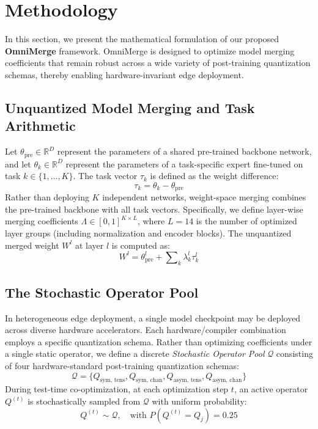 \section{Methodology}
\label{sec:method}

In this section, we present the mathematical formulation of our proposed \textbf{OmniMerge} framework. OmniMerge is designed to optimize model merging coefficients that remain robust across a wide variety of post-training quantization schemas, thereby enabling hardware-invariant edge deployment.

\subsection{Unquantized Model Merging and Task Arithmetic}
Let $\theta_{\text{pre}} \in \mathbb{R}^D$ represent the parameters of a shared pre-trained backbone network, and let $\theta_k \in \mathbb{R}^D$ represent the parameters of a task-specific expert fine-tuned on task $k \in \{1, \dots, K\}$. The task vector $\tau_k$ is defined as the weight difference:
\begin{equation}
    \tau_k = \theta_k - \theta_{\text{pre}}
\end{equation}
Rather than deploying $K$ independent networks, weight-space merging combines the pre-trained backbone with all task vectors. Specifically, we define layer-wise merging coefficients $\Lambda \in [0, 1]^{K \times L}$, where $L = 14$ is the number of optimized layer groups (including normalization and encoder blocks). The unquantized merged weight $W^l$ at layer $l$ is computed as:
\begin{equation}
    W^l = \theta^l_{\text{pre}} + \sum\nolimits_k \lambda^l_k \tau^l_k
\end{equation}

\subsection{The Stochastic Operator Pool}
In heterogeneous edge deployment, a single model checkpoint may be deployed across diverse hardware accelerators. Each hardware/compiler combination employs a specific quantization schema. Rather than optimizing coefficients under a single static operator, we define a discrete \emph{Stochastic Operator Pool} $\mathcal{Q}$ consisting of four hardware-standard post-training quantization schemas:
\begin{equation}
    \mathcal{Q} = \{Q_{\text{sym, tens}}, Q_{\text{sym, chan}}, Q_{\text{asym, tens}}, Q_{\text{asym, chan}}\}
\end{equation}
During test-time co-optimization, at each optimization step $t$, an active operator $Q^{(t)}$ is stochastically sampled from $\mathcal{Q}$ with uniform probability:
\begin{equation}
    Q^{(t)} \sim \mathcal{Q}, \quad \text{with } P(Q^{(t)} = Q_j) = 0.25
\end{equation}

